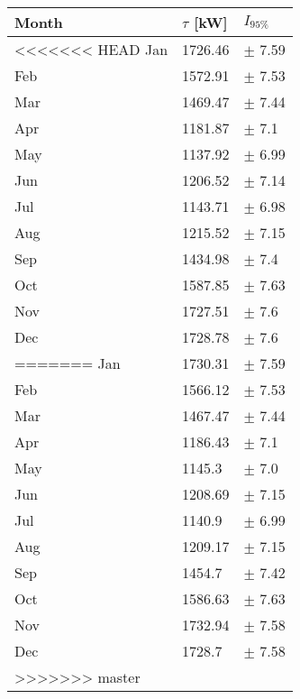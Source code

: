 \begin{tabular}{lll}
\toprule
Month & $\tau$ [kW] &   $I_{95\%}$ \\
\midrule
<<<<<<< HEAD
  Jan &     1726.46 &   $\pm$ 7.59 \\
  Feb &     1572.91 &   $\pm$ 7.53 \\
  Mar &     1469.47 &   $\pm$ 7.44 \\
  Apr &     1181.87 &    $\pm$ 7.1 \\
  May &     1137.92 &   $\pm$ 6.99 \\
  Jun &     1206.52 &   $\pm$ 7.14 \\
  Jul &     1143.71 &   $\pm$ 6.98 \\
  Aug &     1215.52 &   $\pm$ 7.15 \\
  Sep &     1434.98 &    $\pm$ 7.4 \\
  Oct &     1587.85 &   $\pm$ 7.63 \\
  Nov &     1727.51 &    $\pm$ 7.6 \\
  Dec &     1728.78 &    $\pm$ 7.6 \\
=======
  Jan &     1730.31 &   $\pm$ 7.59 \\
  Feb &     1566.12 &   $\pm$ 7.53 \\
  Mar &     1467.47 &   $\pm$ 7.44 \\
  Apr &     1186.43 &    $\pm$ 7.1 \\
  May &      1145.3 &    $\pm$ 7.0 \\
  Jun &     1208.69 &   $\pm$ 7.15 \\
  Jul &      1140.9 &   $\pm$ 6.99 \\
  Aug &     1209.17 &   $\pm$ 7.15 \\
  Sep &      1454.7 &   $\pm$ 7.42 \\
  Oct &     1586.63 &   $\pm$ 7.63 \\
  Nov &     1732.94 &   $\pm$ 7.58 \\
  Dec &      1728.7 &   $\pm$ 7.58 \\
>>>>>>> master
\bottomrule
\end{tabular}
